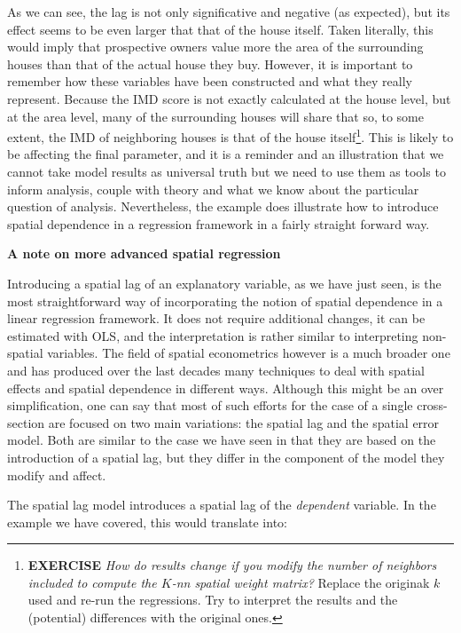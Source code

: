 \documentclass[]{book}
\begin{document}
As we can see, the lag is not only significative and negative (as
expected), but its effect seems to be even larger that that of the house
itself. Taken literally, this would imply that prospective owners value
more the area of the surrounding houses than that of the actual house
they buy. However, it is important to remember how these variables have
been constructed and what they really represent. Because the IMD score
is not exactly calculated at the house level, but at the area level,
many of the surrounding houses will share that so, to some extent, the
IMD of neighboring houses is that of the house itself\footnote{\textbf{EXERCISE}
  \emph{How do results change if you modify the number of neighbors
  included to compute the \(K\)-nn spatial weight matrix?} Replace the
  originak \(k\) used and re-run the regressions. Try to interpret the
  results and the (potential) differences with the original ones.}. This
is likely to be affecting the final parameter, and it is a reminder and
an illustration that we cannot take model results as universal truth but
we need to use them as tools to inform analysis, couple with theory and
what we know about the particular question of analysis. Nevertheless,
the example does illustrate how to introduce spatial dependence in a
regression framework in a fairly straight forward way.

\textbf{A note on more advanced spatial regression}

Introducing a spatial lag of an explanatory variable, as we have just
seen, is the most straightforward way of incorporating the notion of
spatial dependence in a linear regression framework. It does not require
additional changes, it can be estimated with OLS, and the interpretation
is rather similar to interpreting non-spatial variables. The field of
spatial econometrics however is a much broader one and has produced over
the last decades many techniques to deal with spatial effects and
spatial dependence in different ways. Although this might be an over
simplification, one can say that most of such efforts for the case of a
single cross-section are focused on two main variations: the spatial lag
and the spatial error model. Both are similar to the case we have seen
in that they are based on the introduction of a spatial lag, but they
differ in the component of the model they modify and affect.

The spatial lag model introduces a spatial lag of the \emph{dependent}
variable. In the example we have covered, this would translate into:
\end{document}
